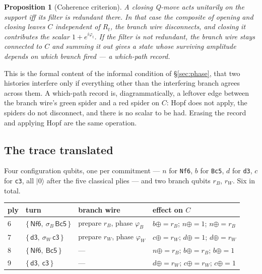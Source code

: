 \documentclass[11pt,a4paper]{article}
\theoremstyle{definition}
\theoremstyle{plain}
\newtheorem{proposition}[definition]{Proposition}
\begin{document}
\begin{proposition}[Coherence criterion]
\label{prop:coherence}
A closing Q-move acts unitarily on the support iff its filter is redundant
there. In that case the composite of opening and closing leaves $C$ independent
of $R_t$, the branch wire disconnects, and closing it contributes the scalar
$1+e^{i\varphi_t}$. If the filter is not redundant, the branch wire stays
connected to $C$ and summing it out gives a state whose surviving amplitude
depends on which branch fired --- a which-path record.
\end{proposition}

This is the formal content of the informal condition of \S\ref{sec:phase}, that
two histories interfere only if everything other than the interfering branch
agrees across them. A which-path record is, diagrammatically, a leftover edge
between the branch wire's green spider and a red spider on $C$: Hopf does not
apply, the spiders do not disconnect, and there is no scalar to be had. Erasing
the record and applying Hopf are the same operation.

\subsection{The trace translated}

Four configuration qubits, one per commitment --- $n$ for \texttt{Nf6}, $b$ for
\texttt{Bc5}, $d$ for \texttt{d3}, $c$ for \texttt{c3}, all $|0\rangle$ after
the five classical plies --- and two branch qubits $r_B$, $r_W$. Six in total.

\begin{center}
\begin{tabular}{llll}
\toprule
ply & turn & branch wire & effect on $C$ \\
\midrule
6 & $\{\,\textsf{Nf6},\ \sigma_B\,\textsf{Bc5}\,\}$
  & prepare $r_B$, phase $\varphi_B$
  & $b \mathrel{{\oplus}{=}} r_B$; $n \mathrel{{\oplus}{=}} 1$; $n \mathrel{{\oplus}{=}} r_B$ \\
7 & $\{\,\textsf{d3},\ \sigma_W\,\textsf{c3}\,\}$
  & prepare $r_W$, phase $\varphi_W$
  & $c \mathrel{{\oplus}{=}} r_W$; $d \mathrel{{\oplus}{=}} 1$; $d \mathrel{{\oplus}{=}} r_W$ \\
8 & $\{\,\textsf{Nf6},\ \textsf{Bc5}\,\}$
  & ---
  & $n \mathrel{{\oplus}{=}} r_B$; $b \mathrel{{\oplus}{=}} r_B$; $b \mathrel{{\oplus}{=}} 1$ \\
9 & $\{\,\textsf{d3},\ \textsf{c3}\,\}$
  & ---
  & $d \mathrel{{\oplus}{=}} r_W$; $c \mathrel{{\oplus}{=}} r_W$; $c \mathrel{{\oplus}{=}} 1$ \\
\bottomrule
\end{tabular}
\end{center}
\end{document}
